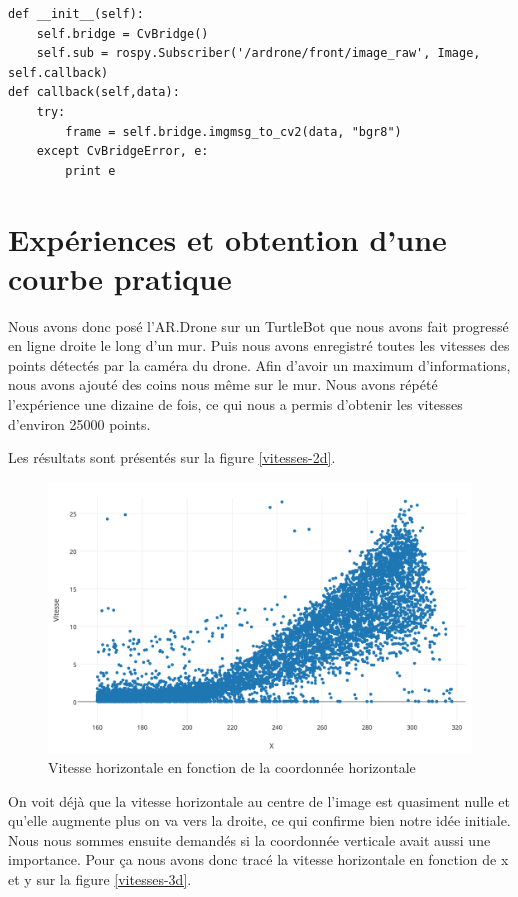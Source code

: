 \documentclass[titlepage,11pt,a4paper]{article}
\begin{document}
\begin{lstlisting}
def __init__(self):
	self.bridge = CvBridge()
	self.sub = rospy.Subscriber('/ardrone/front/image_raw', Image, self.callback)
def callback(self,data):
	try:
		frame = self.bridge.imgmsg_to_cv2(data, "bgr8")
	except CvBridgeError, e:
		print e
\end{lstlisting}

\section{Expériences et obtention d'une courbe \og{}pratique\fg{}}
Nous avons donc posé l'AR.Drone sur un TurtleBot que nous avons fait progressé en ligne droite le long d'un mur. Puis nous avons enregistré toutes les vitesses des points détectés par la caméra du drone. Afin d'avoir un maximum d'informations, nous avons ajouté des coins nous même sur le mur. Nous avons répété l'expérience une dizaine de fois, ce qui nous a permis d'obtenir les vitesses d'environ \num{25000} points.

Les résultats sont présentés sur la figure \vref{vitesses-2d}.

\begin{figure}[!h]
	\centering
	\caption{ Vitesse horizontale en fonction de la coordonnée horizontale}
	\label{vitesses-2d}
	\includegraphics[scale=0.45]{images/vitesses-2d.png}
\end{figure}
On voit déjà que la vitesse horizontale au centre de l'image est quasiment nulle et qu'elle augmente plus on va vers la droite, ce qui confirme bien notre idée initiale. Nous nous sommes ensuite demandés si la coordonnée verticale avait aussi une importance. Pour ça nous avons donc tracé la vitesse horizontale en fonction de x et y sur la figure \vref{vitesses-3d}.
\end{document}
